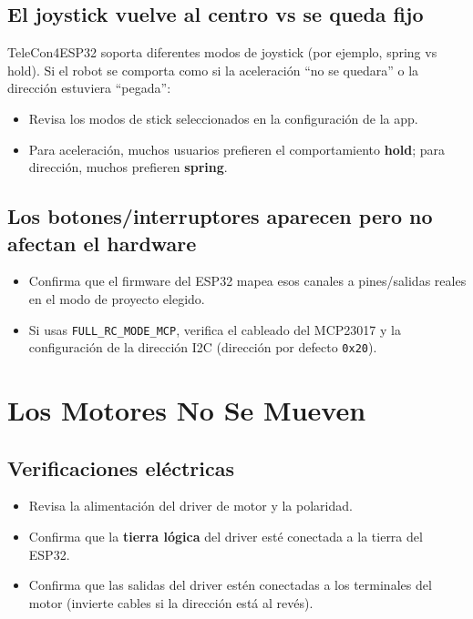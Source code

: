 \subsection*{El joystick vuelve al centro vs se queda fijo}
TeleCon4ESP32 soporta diferentes modos de joystick (por ejemplo, spring vs hold). Si el robot se comporta
como si la aceleración ``no se quedara'' o la dirección estuviera ``pegada'':

\begin{itemize}
    \item Revisa los modos de stick seleccionados en la configuración de la app.
    \item Para aceleración, muchos usuarios prefieren el comportamiento \textbf{hold}; para dirección, muchos prefieren \textbf{spring}.
\end{itemize}

\subsection*{Los botones/interruptores aparecen pero no afectan el hardware}
\begin{itemize}
    \item Confirma que el firmware del ESP32 mapea esos canales a pines/salidas reales en el modo de proyecto elegido.
    \item Si usas \texttt{FULL\_RC\_MODE\_MCP}, verifica el cableado del MCP23017 y la configuración de la dirección I2C (dirección por defecto \texttt{0x20}).
\end{itemize}

\section{Los Motores No Se Mueven}
\label{sec:motors}

\subsection*{Verificaciones eléctricas}
\begin{itemize}
    \item Revisa la alimentación del driver de motor y la polaridad.
    \item Confirma que la \textbf{tierra lógica} del driver esté conectada a la tierra del ESP32.
    \item Confirma que las salidas del driver estén conectadas a los terminales del motor (invierte cables si la dirección está al revés).
\end{itemize}

